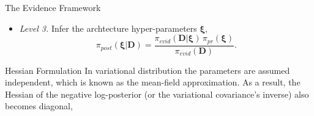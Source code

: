 \documentclass[8pt,xcolor=dvipsnames,compress]{beamer}
\begin{document}
\begin{frame}{The Evidence Framework}
\begin{itemize}
    \item \textit{Level 3.} Infer the archtecture hyper-parameters $\boldsymbol \xi$,
    \begin{equation*}\label{eq:lev3}
    \pi_{post} (\boldsymbol \xi | \boldsymbol D) =
    \frac{\pi_{evid} (\boldsymbol D| \boldsymbol \xi) \,
    \pi_{pr} (\boldsymbol \xi)}{\pi_{evid} (\boldsymbol D)}.
    \end{equation*}

\end{itemize}
\end{frame}
%
\begin{frame}{Hessian Formulation}
In variational distribution the parameters are assumed independent, which is known as the mean-field approximation. As a result, the Hessian of the negative log-posterior (or the variational covariance’s inverse) also becomes diagonal,
\scriptsize
\begin{columns}
\end{columns}
\end{frame}
\end{document}
